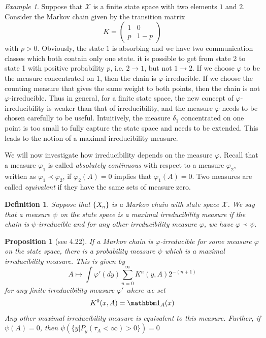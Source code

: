 \documentclass[a4paper, draft]{article}
\theoremstyle{own}
\newtheorem{prop}[thm]{Proposition}
\newtheorem{defn}{Definition}[section]
\theoremstyle{remark}
\newtheorem{example}{Example}[section]
\begin{document}
\begin{example}
	Suppose that ${\mathcal X}$ is a finite state space with two elements $1$ and $2$. Consider the Markov chain given by the transition matrix
	$$
	K = \begin{pmatrix} 1 & 0 \\ p & 1 - p \end{pmatrix}
	$$
	with $p > 0$. Obviously, the state $1$ is absorbing and we have two communication classes which both contain only one state. it is possible to get from state 2 to state 1 with positive probability $p$, i.e. $2 \rightarrow 1$, but not $1 \rightarrow 2$. If we choose $\varphi$ to be the measure concentrated on $1$, then the chain is $\varphi$-irreducible. If we choose the counting measure that gives the same weight to both points, then the chain is not $\varphi$-irreducible. Thus in general, for a finite state space, the new concept of $\varphi$-irreducibility is weaker than that of irreducibility, and the measure $\varphi$ needs to be chosen carefully to be useful. Intuitively, the measure $\delta_1$ concentrated on one point is too small to fully capture the state space and needs to be extended. This leads to the notion of a maximal irreducibility measure.
\end{example}

We will now investigate how irreducibility depends on the measure $\varphi$. Recall that a measure $\varphi_1$ is called {\em absolutely continuous} with respect to a measure $\varphi_2$, written as $\varphi_1 \prec \varphi_2$, if $\varphi_2(A) = 0$ implies that $\varphi_1(A) = 0$. Two measures are called {\em equivalent} if they have the same sets of measure zero. 

\begin{defn}
	Suppose that $\{ X_n \}$ is a Markov chain with state space ${\mathcal X}$. We say that a measure $\psi$ on the state space is a {\em maximal irreducibility measure} if the chain is $\psi$-irreducible and for any other irreducibility measure $\varphi$, we have $\varphi \prec \psi$.
\end{defn}

\begin{prop}[see \cite{MeynTweedie} 4.22]\label{prop:maximalirreducibilitymeasure}
	If a Markov chain is $\varphi$-irreducible for some measure $\varphi$ on the state space, there is a probability measure $\psi$ which is a maximal irreducibility measure. This is given by
	$$
	A \mapsto \int \varphi'(dy) \sum_{n=0}^\infty K^n(y,A) 2^{-(n+1)}
	$$
	for any finite irreducibility measure $\varphi'$ where we set
	$$
	K^0(x,A) = {\mathbbm 1}_A(x)
	$$
	Any other maximal irreducibility measure is equivalent to this measure. 
	Further, if $\psi(A) = 0$, then $\psi(\{ y | P_y(\tau_A < \infty) > 0\}) = 0$
\end{prop}
\end{document}
